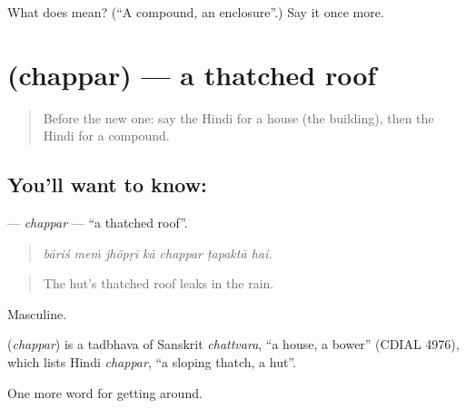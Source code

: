 \begin{tcolorbox}[breakable,colback=teal!4,colframe=teal!35!black,title={Before you move on}]
What does  mean? (\textquotedblleft{}A compound, an enclosure\textquotedblright{}.) Say it once more.
\end{tcolorbox}
\section[\texorpdfstring{\hi{छप्पर} (chappar)}{छप्पर (chappar)}]{ (chappar) — a thatched roof}

\label{lesson:HI-C422-chappar}



\begin{quote}
Before the new one: say the Hindi for a house (the building), then the Hindi for a compound.
\end{quote}

\subsection*{You'll want to know: }
\textbf{} — \emph{chappar} — \textquotedblleft{}a thatched roof\textquotedblright{}.

\begin{quote}
      
\end{quote}

\begin{quote}
\emph{bāriś meṁ jhõpṛī kā chappar ṭapaktā hai.}
\end{quote}

\begin{quote}
The hut's thatched roof leaks in the rain.
\end{quote}

Masculine.

\begin{cousinweb}
\textbf{} (\emph{chappar}) is a tadbhava of Sanskrit \emph{chattvara}, \textquotedblleft{}a house, a bower\textquotedblright{} (CDIAL 4976), which lists Hindi \emph{chappar}, \textquotedblleft{}a sloping thatch, a hut\textquotedblright{}.
\end{cousinweb}

\begin{grammarlens}[title={What you've built}]
One more word for getting around.
\end{grammarlens}

